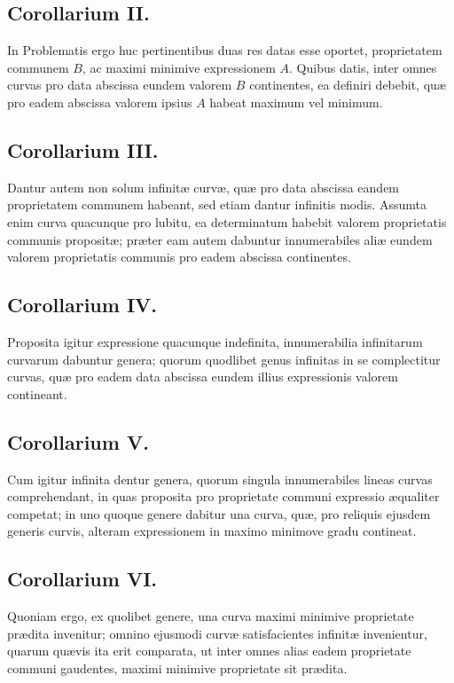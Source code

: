 \subsection*{Corollarium II.}
In Problematis ergo huc pertinentibus duas res datas esse oportet, proprietatem communem $B$, ac maximi minimive expressionem $A$. Quibus datis, inter omnes curvas pro data abscissa eundem valorem $B$ continentes, ea definiri debebit, quæ pro eadem abscissa valorem ipsius $A$ habeat maximum vel minimum.

\subsection*{Corollarium III.}
Dantur autem non solum infinitæ curvæ, quæ pro data abscissa eandem proprietatem communem habeant, sed etiam dantur infinitis modis. Assumta enim curva quacunque pro lubitu, ea determinatum habebit valorem proprietatis communis propositæ; præter eam autem dabuntur innumerabiles aliæ eundem valorem proprietatis communis pro eadem abscissa continentes.

\subsection*{Corollarium IV.}
Proposita igitur expressione quacunque indefinita, innumerabilia infinitarum curvarum dabuntur genera; quorum quodlibet genus infinitas in se complectitur curvas, quæ pro eadem data abscissa eundem illius expressionis valorem contineant.

\subsection*{Corollarium V.}
Cum igitur infinita dentur genera, quorum singula innumerabiles lineas curvas comprehendant, in quas proposita pro proprietate communi expressio æqualiter competat; in uno quoque genere dabitur una curva, quæ, pro reliquis ejusdem generis curvis, alteram expressionem in maximo minimove gradu contineat.

\subsection*{Corollarium VI.}
Quoniam ergo, ex quolibet genere, una curva maximi minimive proprietate prædita invenitur; omnino ejusmodi curvæ satisfacientes infinitæ invenientur, quarum quævis ita erit comparata, ut inter omnes alias eadem proprietate communi gaudentes, maximi minimive proprietate sit prædita.

